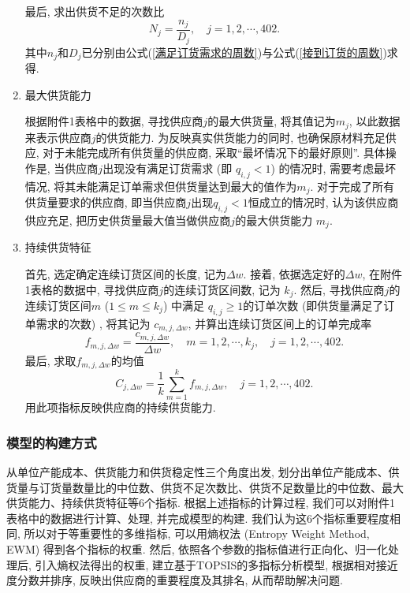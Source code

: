 \documentclass[11pt, fontset = windows]{article}
\begin{document}
\begin{enumerate}
          最后, 求出供货不足的次数比
          \begin{equation}
              N_j=\frac{n_j}{D_j},\quad j=1,2,\cdots,402.
          \end{equation}
          其中$n_j$和$D_j$已分别由公式(\ref{满足订货需求的周数})与公式(\ref{接到订货的周数})求得.


    \item 最大供货能力

          根据附件1表格中的数据, 寻找供应商$j$的最大供货量, 将其值记为$m_j$, 以此数据来表示供应商$j$的供货能力.
          为反映真实供货能力的同时, 也确保原材料充足供应, 对于未能完成所有供货量的供应商, 采取“最坏情况下的最好原则”.
          具体操作是, 当供应商$j$出现没有满足订货需求 (即 $q_{i,j}<1$) 的情况时, 需要考虑最坏情况, 将其未能满足订单需求但供货量达到最大的值作为$m_j$.
          对于完成了所有供货量要求的供应商, 即当供应商$j$出现$q_{i,j}<1$恒成立的情况时, 认为该供应商供应充足, 把历史供货量最大值当做供应商$j$的最大供货能力 $m_j$.

    \item 持续供货特征

          首先, 选定确定连续订货区间的长度, 记为$\Delta w$.
          接着, 依据选定好的$\Delta w$, 在附件1表格的数据中, 寻找供应商$j$的连续订货区间数, 记为 $k_j$.
          然后, 寻找供应商$j$的连续订货区间$m$ ($1\leq m\leq k_j$) 中满足 $q_{i,j} \geq 1$的订单次数 (即供货量满足了订单需求的次数) , 将其记为 $c_{m,j,\Delta w}$, 并算出连续订货区间上的订单完成率
          \begin{equation}
              f_{m,j,\Delta w}=\frac{c_{m,j,\Delta w}}{\Delta w},\quad m=1,2,\cdots,k_j,\quad j=1,2,\cdots,402.
          \end{equation}
          最后, 求取$f_{m,j,\Delta w}$的均值
          \begin{equation}
              C_{j,\Delta w}=\frac{1}{k}\sum_{m=1}^k f_{m,j,\Delta w},\quad j=1,2,\cdots,402.
          \end{equation}
          用此项指标反映供应商的持续供货能力.

\end{enumerate}

\subsubsection[]{模型的构建方式}

从单位产能成本、供货能力和供货稳定性三个角度出发, 划分出单位产能成本、供货量与订货量数量比的中位数、供货不足次数比、供货不足数量比的中位数、最大供货能力、持续供货特征等6个指标.
根据上述指标的计算过程, 我们可以对附件1表格中的数据进行计算、处理, 并完成模型的构建.
我们认为这6个指标重要程度相同, 所以对于等重要性的多维指标, 可以用熵权法 (Entropy Weight Method, EWM) 得到各个指标的权重.
然后, 依照各个参数的指标值进行正向化、归一化处理后, 引入熵权法得出的权重, 建立基于TOPSIS的多指标分析模型, 根据相对接近度分数并排序, 反映出供应商的重要程度及其排名, 从而帮助解决问题. \cite{张文博2022}
\end{document}
